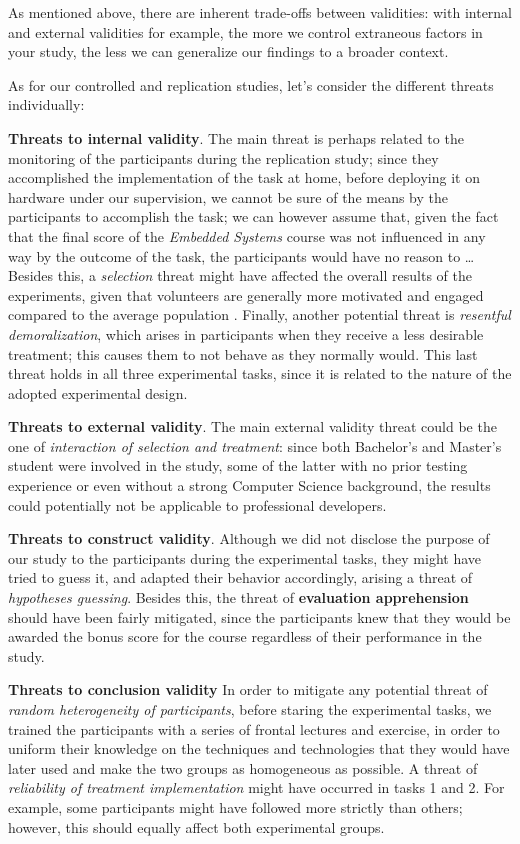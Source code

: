 As mentioned above, there are inherent trade-offs between validities: with internal and external validities for example, the more we control extraneous factors in your study, the less we can generalize our findings to a broader context.


As for our controlled and replication studies, let's consider the different threats individually:

\noindent\textbf{Threats to internal validity}.
The main threat is perhaps related to the monitoring of the participants during the replication study; since they accomplished the implementation of the task at home, before deploying it on hardware under our supervision, we cannot be sure of the means by the participants to accomplish the task; we can however assume that, given the fact that the final score of the \textit{Embedded Systems} course was not influenced in any way by the outcome of the task, the participants would have no reason to \dots
Besides this, a \textit{selection} threat might have affected the overall results of the experiments, given that volunteers are generally more motivated and engaged compared to the average population \cite{DBLP:books/sp/WohlinRHOR00}. Finally, another potential threat is \textit{resentful demoralization}, which arises in participants when they receive a less desirable treatment; this causes them to not behave as they normally would. This last threat holds in all three experimental tasks, since it is related to the nature of the adopted experimental design.

\noindent\textbf{Threats to external validity}.
The main external validity threat could be the one of \textit{interaction of selection and treatment}: since both Bachelor's and Master's student were involved in the study, some of the latter with no prior testing experience or even without a strong Computer Science background, the results could potentially not be applicable to professional developers. 

\noindent\textbf{Threats to construct validity}.
Although we did not disclose the purpose of our study to the participants during the experimental tasks, they might have tried to guess it, and adapted their behavior accordingly, arising a threat of \textit{hypotheses guessing}. Besides this, the threat of \textbf{evaluation apprehension} should have been fairly mitigated, since the participants knew that they would be awarded the bonus score for the course regardless of their performance in the study.

\noindent\textbf{Threats to conclusion validity}
In order to mitigate any potential threat of \textit{random heterogeneity of participants}, before staring the experimental tasks, we trained the participants with a series of frontal lectures and exercise, in order to uniform their knowledge on the techniques and technologies that they would have later used and make the two groups as homogeneous as possible. A threat of \textit{reliability of treatment implementation} might have occurred in tasks 1 and 2. For example, some participants might have followed \tdd more strictly than others; however, this should equally affect both experimental groups.

